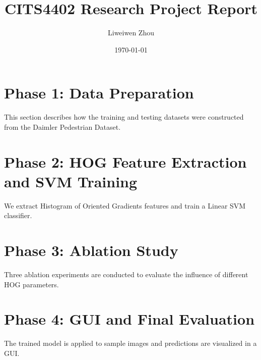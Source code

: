 \documentclass{article}
\title{CITS4402 Research Project Report}
\author{Liweiwen Zhou}
\date{\today}
\begin{document}
\maketitle

\section*{Phase 1: Data Preparation}
This section describes how the training and testing datasets were constructed from the Daimler Pedestrian Dataset.

\section*{Phase 2: HOG Feature Extraction and SVM Training}
We extract Histogram of Oriented Gradients features and train a Linear SVM classifier.

\section*{Phase 3: Ablation Study}
Three ablation experiments are conducted to evaluate the influence of different HOG parameters.

\section*{Phase 4: GUI and Final Evaluation}
The trained model is applied to sample images and predictions are visualized in a GUI.
\end{document}
